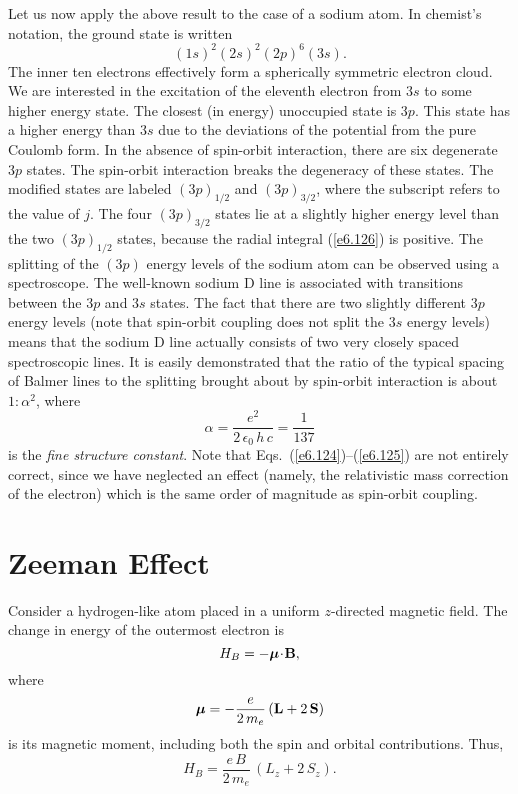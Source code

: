 Let us now apply the above result to the case of a sodium atom. 
In chemist's notation, the ground state is written
\begin{equation}
(1s)^2 (2s)^2(2p)^6(3s).
\end{equation}
The inner ten electrons effectively form a spherically symmetric electron
cloud. We are interested in the excitation of the eleventh electron
from $3s$ to some higher energy state. The closest (in energy) unoccupied
state is $3p$. This state has a higher energy than $3s$ due to the deviations
of the potential from the pure Coulomb form. In the absence of spin-orbit
interaction, there are six degenerate $3p$ states. The spin-orbit
interaction breaks the degeneracy of these states. The modified states are
labeled $(3p)_{1/2}$ and $(3p)_{3/2}$, where the subscript refers to the
value of $j$. The four $(3p)_{3/2}$ states lie at a slightly higher
energy level than the two $(3p)_{1/2}$ states,
because the radial integral (\ref{e6.126}) is positive.  The splitting of
the $(3p)$ energy levels of the sodium atom can be observed
using a  spectroscope.
The well-known sodium D line is associated with transitions between 
the $3p$ and $3s$ states. The fact that there are two  slightly different
$3p$ energy levels (note that spin-orbit coupling does not split
the $3s$ energy levels) means that the sodium D line actually consists
of two very closely spaced spectroscopic lines. It is easily
demonstrated that the ratio of the typical spacing of
 Balmer lines to the splitting 
brought about by spin-orbit interaction is about $1 : \alpha^2$,
where
\begin{equation}
\alpha = \frac{e^2}{2\,\epsilon_0\, h\, c} = \frac{1}{137}
\end{equation}
is the {\em fine structure constant}. Note that Eqs.~(\ref{e6.124})--(\ref{e6.125}) are not
entirely correct, since we have neglected an effect (namely, the
relativistic mass correction of the electron) which is the same
order of magnitude as spin-orbit coupling. 

\section{Zeeman Effect}
Consider a hydrogen-like atom placed in a uniform $z$-directed
magnetic field. The change in energy of the outermost electron is
\begin{equation}
H_B = -\mbox{\boldmath$\mu$} \! \cdot \! {\bf B},
\end{equation}
where 
\begin{equation}
\mbox{\boldmath$\mu$} = - \frac{e}{2\,m_e}\, ({\bf L} + 2 \,{\bf S})
\end{equation}
is its magnetic moment, including both the spin  and
orbital  contributions.
Thus,
\begin{equation}
H_B = \frac{e\, B}{2\, m_e}\, (L_z + 2\, S_z).
\end{equation}

